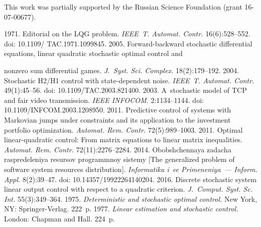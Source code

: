 


\vspace*{-12pt}

\Ack
\noindent
This work was partially supported by the Russian Science Foundation (grant  
16-07-00677).




  \begin{multicols}{2}

\renewcommand{\bibname}{\protect\rmfamily References}

{\small\frenchspacing
 {%
 \begin{thebibliography}{99}
 1971. Editorial on the LQG problem. \textit{IEEE~T. 
Automat. Contr.} 16(6):528--552. doi: 10.1109/ TAC.1971.1099845.
 2005. Forward-backward stochastic differential equations, linear 
quadratic stochastic optimal control and\linebreak\vspace*{-12pt}

\columnbreak

\noindent
 nonzero sum differential games. 
\textit{J.~Syst. Sci. Complex.} 18(2):179--192.
 2004. Stochastic H2/H1 control with  
state-dependent noise. \textit{IEEE~T. Automat. Contr.} 49(1):45--56.
doi: 10.1109/TAC.2003.821400.
 2003. A~stochastic model of TCP and fair video 
transmission. \textit{IEEE INFOCOM}. 2:1134--1144.
doi: 10.1109/INFCOM.2003.1208950.
 2011. Predictive control of 
systems with Markovian jumps under constraints and its application to the 
investment portfolio optimization. \textit{Automat. Rem. Contr.}  
72(5):989--1003.
 2011. Optimal linear-quadratic 
control: From matrix equations to linear matrix inequalities. \textit{Automat. 
Rem. Contr.} 72(11):2276--2284.
 2014. Obobshchennaya zadacha raspredeleniya resursov 
programmnoy sistemy [The generalized problem of software system resources 
distribution]. \textit{Informatika i~ee Primeneniya~--- Inform. Appl.}  
8(2):39--47. doi: 
10.14357/19922264140204.
 2016. Discrete stochastic system linear output control 
with respect to a quadratic criterion. \textit{J.~Comput. Syst. Sc. 
Int.} 55(3):349--364.
 1975. \textit{Deterministic and 
stochastic optimal control.} New York, NY: Springer-Verlag. 222~p.
 1977. \textit{Linear estimation and stochastic 
control.} London: Chapman and Hall. 224~p.
\end{thebibliography}

}}
\end{multicols}
